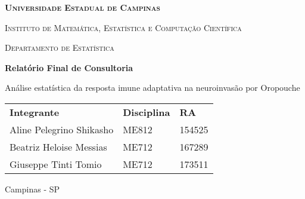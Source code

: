 \begin{titlepage}
	\begin{center}
		\textsc{\textbf{\large Universidade Estadual de Campinas}}

		\textsc{Instituto de Matemática, Estatística e Computação Científica}

		\textsc{Departamento de Estatística}

		\vspace{3cm}
		\textbf{\Large Relatório Final de Consultoria}

        \vspace{1.5mm}
		{\large Análise estatística da resposta imune adaptativa na neuroinvasão por Oropouche}

		\vspace{4cm}
		\begin{flushright}
			\begin{tabular}{lll}
				\textbf{Integrante}      & \textbf{Disciplina} & \textbf{RA} \\
				Aline Pelegrino Shikasho & ME812               & 154525 \\[-0.75mm]
				Beatriz Heloise Messias  & ME712               & 167289 \\[-0.75mm]
				Giuseppe Tinti Tomio     & ME712               & 173511 \\[-0.75mm]
			\end{tabular}
		\end{flushright}

		\vfill
		Campinas - SP
	\end{center}
\end{titlepage}
